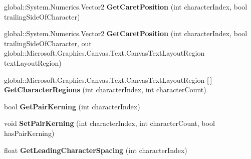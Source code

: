 \begin{DoxyCompactItemize}
\item 
\mbox{\label{interface_microsoft_1_1_graphics_1_1_canvas_1_1_text_1_1_i_canvas_text_layout_a1ed232fe08a85f9c93273ae59226368a}} 
global\+::\+System.\+Numerics.\+Vector2 {\bfseries Get\+Caret\+Position} (int character\+Index, bool trailing\+Side\+Of\+Character)
\item 
\mbox{\label{interface_microsoft_1_1_graphics_1_1_canvas_1_1_text_1_1_i_canvas_text_layout_a5f70488facfba5d5a53175e0fbdb74e0}} 
global\+::\+System.\+Numerics.\+Vector2 {\bfseries Get\+Caret\+Position} (int character\+Index, bool trailing\+Side\+Of\+Character, out global\+::\+Microsoft.\+Graphics.\+Canvas.\+Text.\+Canvas\+Text\+Layout\+Region text\+Layout\+Region)
\item 
\mbox{\label{interface_microsoft_1_1_graphics_1_1_canvas_1_1_text_1_1_i_canvas_text_layout_a9ce2304a76b40116670a355bc5982d5b}} 
global\+::\+Microsoft.\+Graphics.\+Canvas.\+Text.\+Canvas\+Text\+Layout\+Region \mbox{[}$\,$\mbox{]} {\bfseries Get\+Character\+Regions} (int character\+Index, int character\+Count)
\item 
\mbox{\label{interface_microsoft_1_1_graphics_1_1_canvas_1_1_text_1_1_i_canvas_text_layout_aad1825e0663c1f7846a93a175cf888e5}} 
bool {\bfseries Get\+Pair\+Kerning} (int character\+Index)
\item 
\mbox{\label{interface_microsoft_1_1_graphics_1_1_canvas_1_1_text_1_1_i_canvas_text_layout_a20aaafcf4e028122cfc8726b8fbc1f5b}} 
void {\bfseries Set\+Pair\+Kerning} (int character\+Index, int character\+Count, bool has\+Pair\+Kerning)
\item 
\mbox{\label{interface_microsoft_1_1_graphics_1_1_canvas_1_1_text_1_1_i_canvas_text_layout_addf54ecd9d5f689e2f22514aabe8c42e}} 
float {\bfseries Get\+Leading\+Character\+Spacing} (int character\+Index)
\item 

\end{DoxyCompactItemize}
